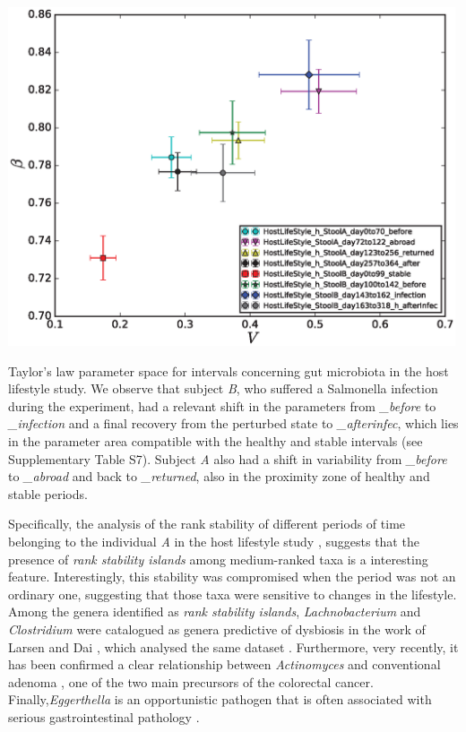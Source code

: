 \begin{supfig}
	\centering
	\includegraphics[width=0.99\textwidth]{figs/supfig_HLS_xWSummary.eps}
	\caption{Taylor's law parameter space for intervals concerning gut microbiota in the host lifestyle study\cite{hostlife}. We observe that subject \emph{B}, who suffered a Salmonella infection during the experiment, had a relevant shift in the parameters from \emph{\_before} to \emph{\_infection} and a final recovery from the perturbed state to \emph{\_afterinfec}, which lies in the parameter area compatible with the healthy and stable intervals (see Supplementary Table S7). Subject \emph{A} also had a shift in variability from \emph{\_before} to \emph{\_abroad} and back to \emph{\_returned}, also in the proximity zone of healthy and stable periods.}
	\label{supfig:HLS_xWSummary}
\end{supfig}
 
Specifically, the analysis of the rank stability of different periods of time belonging to the individual \emph{A} in the host lifestyle study \cite{hostlife}, suggests that the presence of \emph{rank stability islands} among medium-ranked taxa is a interesting feature. Interestingly, this stability was compromised when the period was not an ordinary one, suggesting that those taxa were sensitive to changes in the lifestyle. Among the genera identified as \emph{rank stability islands}, \emph{Lachnobacterium} and \emph{Clostridium} were catalogued as genera predictive of dysbiosis in the work of Larsen and Dai \cite{rsi_dysbiosis}, which analysed the same dataset \cite{hostlife}. Furthermore, very recently, it has been confirmed a clear relationship between \emph{Actinomyces} and conventional adenoma \cite{rsi_actino}, one of the two main precursors of the colorectal cancer. Finally,\emph{Eggerthella} is an opportunistic pathogen that is often associated with serious gastrointestinal pathology \cite{rsi_egg}.

